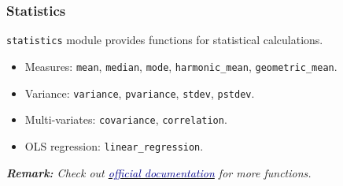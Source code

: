 \documentclass[beamer, en, version=2.0]{huangfusl-template}
\begin{document}
    \begin{frame}[fragile]
        \frametitle{Statistics}

        {\footnotesize\verb|statistics|} module provides functions for statistical calculations.

        \begin{itemize}
            \item Measures: {\footnotesize\verb|mean|}, {\footnotesize\verb|median|}, {\footnotesize\verb|mode|}, {\footnotesize\verb|harmonic_mean|}, {\footnotesize\verb|geometric_mean|}.
            \item Variance: {\footnotesize\verb|variance|}, {\footnotesize\verb|pvariance|}, {\footnotesize\verb|stdev|}, {\footnotesize\verb|pstdev|}.
            \item Multi-variates: {\footnotesize\verb|covariance|}, {\footnotesize\verb|correlation|}.
            \item OLS regression: {\footnotesize\verb|linear_regression|}.
        \end{itemize}
        {\footnotesize\itshape\textbf{Remark:} Check out \href{https://docs.python.org/3/library/statistics.html}{\textcolor{darkblue}{official documentation}} for more functions.}
    \end{frame}
\end{document}
